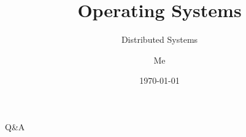 \documentclass[12pt]{beamer}
\title{Operating Systems}
\subtitle{Distributed Systems}
\author{Me}
\date{\today}
\begin{document}
  \begin{frame}
    \titlepage
  \end{frame}

  
  
  

  \begin{frame}
  \begin{center}
  \Huge Q\&A
  \end{center}
  \end{frame}
\end{document}
